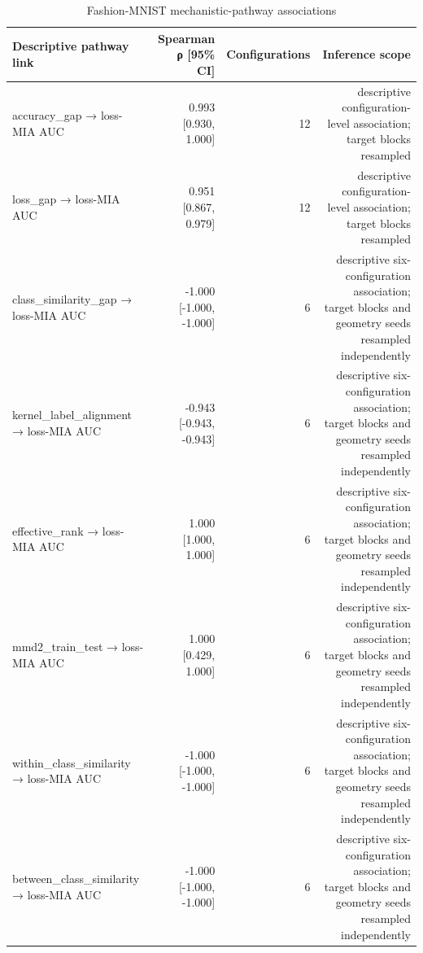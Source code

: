 \begin{table}
\caption{Fashion-MNIST mechanistic-pathway associations}
\label{tab:satml_fashion_pathway}
\begin{tabular}{lrrr}
\toprule
Descriptive pathway link & Spearman ρ [95\% CI] & Configurations & Inference scope \\
\midrule
accuracy\_gap → loss-MIA AUC & 0.993 [0.930, 1.000] & 12 & descriptive configuration-level association; target blocks resampled \\
loss\_gap → loss-MIA AUC & 0.951 [0.867, 0.979] & 12 & descriptive configuration-level association; target blocks resampled \\
class\_similarity\_gap → loss-MIA AUC & -1.000 [-1.000, -1.000] & 6 & descriptive six-configuration association; target blocks and geometry seeds resampled independently \\
kernel\_label\_alignment → loss-MIA AUC & -0.943 [-0.943, -0.943] & 6 & descriptive six-configuration association; target blocks and geometry seeds resampled independently \\
effective\_rank → loss-MIA AUC & 1.000 [1.000, 1.000] & 6 & descriptive six-configuration association; target blocks and geometry seeds resampled independently \\
mmd2\_train\_test → loss-MIA AUC & 1.000 [0.429, 1.000] & 6 & descriptive six-configuration association; target blocks and geometry seeds resampled independently \\
within\_class\_similarity → loss-MIA AUC & -1.000 [-1.000, -1.000] & 6 & descriptive six-configuration association; target blocks and geometry seeds resampled independently \\
between\_class\_similarity → loss-MIA AUC & -1.000 [-1.000, -1.000] & 6 & descriptive six-configuration association; target blocks and geometry seeds resampled independently \\
\bottomrule
\end{tabular}
\end{table}


